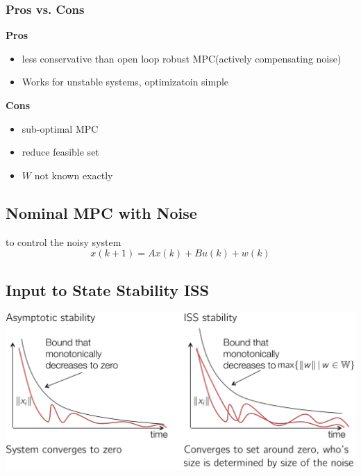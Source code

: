 \subsubsection{Pros vs. Cons}
\begin{minipage}[t]{0.65\linewidth}
\textbf{Pros} 
\begin{itemize}
    \item less conservative than open loop robust MPC(actively compensating noise)\\
    \item Works for unstable systems, optimizatoin simple
\end{itemize}
\end{minipage}
\begin{minipage}[t]{0.3\linewidth}
\textbf{Cons}
\begin{itemize}
    \item sub-optimal MPC
    \item reduce feasible set
    \item $W$ not known exactly
\end{itemize}
\end{minipage}
\subsection{Nominal MPC with Noise}
to control the noisy system \[x(k+1) = Ax(k)+Bu(k)+w(k)\]
\subsection{Input to State Stability ISS}
\begin{center}
\includegraphics[width=0.7\linewidth]{MPC_summary/Images/Asymptotic_stability_ISS.jpg}
\end{center}